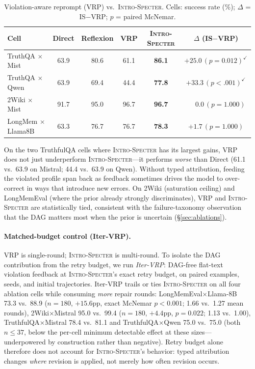 \documentclass{article}
\newcommand{\method}{\textsc{Intro-Specter}\xspace}
\begin{document}
\begin{table}[H]\centering\small
\caption{Violation-aware reprompt (VRP) vs.\ \method. Cells: success rate (\%); $\Delta$ = IS$-$VRP; $p$ = paired McNemar.}
\label{tab:vrp}\setlength{\tabcolsep}{4pt}
\begin{tabular}{lccccc}\toprule
Cell & Direct & Reflexion & VRP & \method & $\Delta$ (IS$-$VRP) \\\midrule
TruthQA $\times$ Mist & 63.9 & 80.6 & 61.1 & \textbf{86.1} & $+25.0\,(p{=}0.012)^{\checkmark}$ \\
TruthQA $\times$ Qwen & 63.9 & 69.4 & 44.4 & \textbf{77.8} & $+33.3\,(p{<}.001)^{\checkmark}$ \\
2Wiki $\times$ Mist   & 91.7 & 95.0 & 96.7 & \textbf{96.7} & $\phantom{+0}0.0\,(p{=}1.000)$ \\
LongMem $\times$ Llama8B & 63.3 & 76.7 & 76.7 & \textbf{78.3} & $+1.7\,(p{=}1.000)$ \\
\bottomrule\end{tabular}\end{table}

On the two TruthfulQA cells where \method has its largest gains, VRP does not just underperform \method---it performs \emph{worse} than Direct (61.1 vs.\ 63.9 on Mistral; 44.4 vs.\ 63.9 on Qwen). Without typed attribution, feeding the violated profile span back as feedback sometimes drives the model to over-correct in ways that introduce new errors. On 2Wiki (saturation ceiling) and LongMemEval (where the prior already strongly discriminates), VRP and \method are statistically tied, consistent with the failure-taxonomy observation that the DAG matters most when the prior is uncertain (\S\ref{sec:ablations}).

\paragraph{Matched-budget control (Iter-VRP).} VRP is single-round; \method is multi-round. To isolate the DAG contribution from the retry budget, we run \emph{Iter-VRP}: DAG-free flat-text violation feedback at \method's exact retry budget, on paired examples, seeds, and initial trajectories. Iter-VRP trails or ties \method on all four ablation cells while consuming \emph{more} repair rounds: LongMemEval$\times$Llama-8B 73.3 vs.\ 88.9 ($n{=}180$, $+15.6$pp, exact McNemar $p{<}0.001$; 1.66 vs.\ 1.27 mean rounds), 2Wiki$\times$Mistral 95.0 vs.\ 99.4 ($n{=}180$, $+4.4$pp, $p{=}0.022$; 1.13 vs.\ 1.00), TruthfulQA$\times$Mistral 78.4 vs.\ 81.1 and TruthfulQA$\times$Qwen 75.0 vs.\ 75.0 (both $n{\le}37$, below the per-cell minimum detectable effect at these sizes---underpowered by construction rather than negative). Retry budget alone therefore does not account for \method's behavior: typed attribution changes \emph{where} revision is applied, not merely how often revision occurs.
\end{document}
